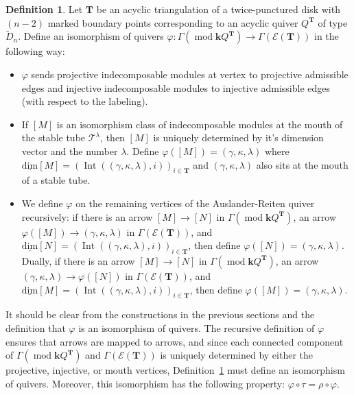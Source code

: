 \documentclass[11pt]{amsart}
\theoremstyle{plain}
\theoremstyle{definition}
\newtheorem{definition}[theorem]{Definition}
\numberwithin{equation}{section}
\def\TT{\mathbf{T}}
\renewcommand{\k}{\mathbf{k}}
\renewcommand{\mod}{\operatorname{mod}}
\newcommand{\Int}{\operatorname{Int}}
\newcommand{\udim}{\operatorname{\underline{dim}}}
\begin{document}
\begin{definition}\label{def-phi}
    Let $\TT$ be an acyclic triangulation of a twice-punctured disk with $(n-2)$ marked boundary points corresponding to an acyclic quiver $Q^\TT$ of type $\widetilde{D}_n$.
    Define an isomorphism of quivers $\varphi: \Gamma(\mod\k Q^\TT) \to \Gamma(\mathcal{E}(\TT))$ in the following way:
    \begin{itemize}
        \item $\varphi$ sends projective indecomposable modules at vertex to projective admissible edges and injective indecomposable modules to injective admissible edges (with respect to the labeling).
        \item If $[M]$ is an isomorphism class of indecomposable modules at the mouth of the stable tube $\mathcal{T}^\lambda$, then $[M]$ is uniquely determined by it's dimension vector and the number $\lambda$.
        Define $\varphi([M]) = (\gamma, \kappa, \lambda)$ where $\udim [M] = (\Int((\gamma,\kappa, \lambda), i ))_{i \in \TT}$ and $(\gamma, \kappa, \lambda)$ also sits at the mouth of a stable tube.
        \item We define $\varphi$ on the remaining vertices of the Auslander-Reiten quiver recursively: if there is an arrow $[M] \to [N]$ in $\Gamma(\mod\k Q^\TT)$, an arrow $\varphi([M]) \to (\gamma, \kappa, \lambda)$ in $\Gamma(\mathcal{E}(\TT))$, and $\udim [N] = (\Int((\gamma,\kappa, \lambda), i ))_{i \in \TT}$, then define $\varphi([N]) = (\gamma,\kappa, \lambda).$ 
        Dually, if there is an arrow $[M] \to [N]$ in $\Gamma(\mod\k Q^\TT)$, an arrow $(\gamma, \kappa, \lambda) \to \varphi([N])$ in $\Gamma(\mathcal{E}(\TT))$, and $\udim [M] = (\Int((\gamma,\kappa, \lambda), i ))_{i \in \TT}$, then define $\varphi([M]) = (\gamma,\kappa, \lambda).$ 
    \end{itemize}
\end{definition}


It should be clear from the constructions in the previous sections and the definition that $\varphi$ is an isomorphism of quivers. 
The recursive definition of $\varphi$ ensures that arrows are mapped to arrows, and since each connected component of $\Gamma(\mod\k Q^\TT)$ and $\Gamma(\mathcal{E}(\TT))$ is uniquely determined by either the projective, injective, or mouth vertices, Definition~\ref{def-phi} must define an isomorphism of quivers. 
Moreover, this isomorphism has the following property: $\varphi \circ \tau = \rho \circ \varphi$.
\end{document}
